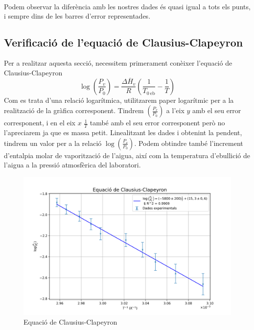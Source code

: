 \documentclass{article}
\begin{document}
        \hfill{}\\
        Podem observar la diferència amb les nostres dades és quasi igual a tots els punts, i sempre dins de les barres d'error representades.

        \clearpage
    \subsection{Verificació de l'equació de Clausius-Clapeyron}
        Per a realitzar aquesta secció, necessitem primerament conèixer l'equació de Clausius-Clapeyron\[\log\left(\frac{P_v}{P_0}\right)=\frac{\Delta \overline{H}_v}{R}\left(\frac{1}{T_{0\ \text{eb}}}-\frac{1}{T}\right)\]\label{eq:Clausius}Com es trata d'una relació logarítmica, utilitzarem paper logarítmic per a la realització de la gràfica corresponent. Tindrem $\left(\frac{P_v}{P_0}\right)$ a l'eix $y$ amb el seu error corresponent, i en el eix $x$ $\frac{1}{T}$ també amb el seu error corresponent però no l'apreciarem ja que es massa petit. Linealitzant les dades i obtenint la pendent, tindrem un valor per a la relació $\log\left(\frac{P_v}{P_0}\right)$. Podem obtindre també l'increment d'entalpia molar de vaporització de l'aigua, així com la temperatura d'ebullició de l'aigua a la pressió atmosfèrica del laboratori.
        \begin{figure}[h]\label{fig:Clausius}
            \centering
            \includegraphics[width=.75\textwidth]{fotos/Clausius-Claperyon.png}
            \caption{Equació de Clausius-Clapeyron}
        \end{figure}
        \hfill{}\\
\end{document}
